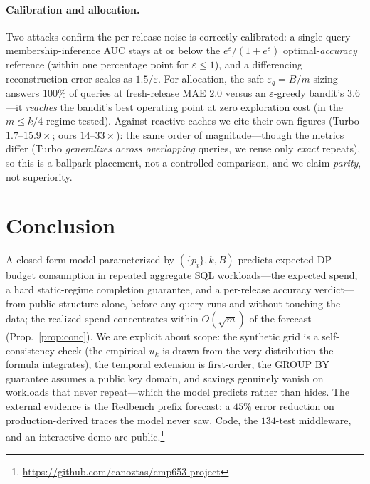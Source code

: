 \documentclass[runningheads]{llncs}
\newcommand{\eps}{\varepsilon}
\begin{document}
\paragraph{Calibration and allocation.} Two attacks confirm the per-release noise is correctly calibrated: a single-query membership-inference AUC stays at or below the $e^\eps/(1+e^\eps)$ optimal-\emph{accuracy} reference (within one percentage point for $\eps\le1$), and a differencing reconstruction error scales as $1.5/\eps$. For allocation, the safe $\eps_q{=}B/m$ sizing answers $100\%$ of queries at fresh-release MAE $2.0$ versus an $\eps$-greedy bandit's $3.6$---it \emph{reaches} the bandit's best operating point at zero exploration cost (in the $m\le k/4$ regime tested). Against reactive caches we cite their own figures (Turbo $1.7$--$15.9\times$; ours $14$--$33\times$): the same order of magnitude---though the metrics differ (Turbo \emph{generalizes across overlapping} queries, we reuse only \emph{exact} repeats), so this is a ballpark placement, not a controlled comparison, and we claim \emph{parity}, not superiority.

\section{Conclusion}
\label{sec:concl}

A closed-form model parameterized by $(\{p_i\},k,B)$ predicts expected DP-budget consumption in repeated aggregate SQL workloads---the expected spend, a hard static-regime completion guarantee, and a per-release accuracy verdict---from public structure alone, before any query runs and without touching the data; the realized spend concentrates within $O(\sqrt m)$ of the forecast (Prop.~\ref{prop:conc}). We are explicit about scope: the synthetic grid is a self-consistency check (the empirical $u_k$ is drawn from the very distribution the formula integrates), the temporal extension is first-order, the GROUP BY guarantee assumes a public key domain, and savings genuinely vanish on workloads that never repeat---which the model predicts rather than hides. The external evidence is the Redbench prefix forecast: a $45\%$ error reduction on production-derived traces the model never saw. Code, the $134$-test middleware, and an interactive demo are public.\footnote{\url{https://github.com/canoztas/cmp653-project}}
\end{document}
